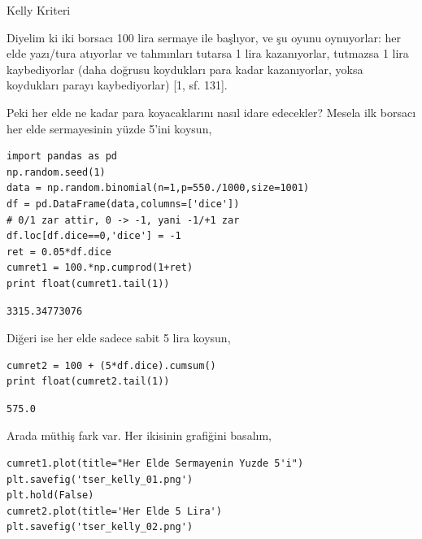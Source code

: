 \documentclass[12pt,fleqn]{article}\usepackage{../../common}
\begin{document}
Kelly Kriteri 

Diyelim ki iki borsacı 100 lira sermaye ile başlıyor, ve şu oyunu
oynuyorlar: her elde yazı/tura atıyorlar ve tahmınları tutarsa 1 lira
kazanıyorlar, tutmazsa 1 lira kaybediyorlar (daha doğrusu koydukları para
kadar kazanıyorlar, yoksa koydukları parayı kaybediyorlar) [1, sf. 131].

Peki her elde ne kadar para koyacaklarını nasıl idare edecekler? Mesela ilk
borsacı her elde sermayesinin yüzde 5'ini koysun,

\begin{verbatim}
import pandas as pd
np.random.seed(1)
data = np.random.binomial(n=1,p=550./1000,size=1001)
df = pd.DataFrame(data,columns=['dice'])
# 0/1 zar attir, 0 -> -1, yani -1/+1 zar
df.loc[df.dice==0,'dice'] = -1
ret = 0.05*df.dice
cumret1 = 100.*np.cumprod(1+ret)
print float(cumret1.tail(1))
\end{verbatim}

\begin{verbatim}
3315.34773076
\end{verbatim}

Diğeri ise her elde sadece sabit 5 lira koysun,

\begin{verbatim}
cumret2 = 100 + (5*df.dice).cumsum()
print float(cumret2.tail(1))
\end{verbatim}

\begin{verbatim}
575.0
\end{verbatim}

Arada müthiş fark var. Her ikisinin grafiğini basalım, 

\begin{verbatim}
cumret1.plot(title="Her Elde Sermayenin Yuzde 5'i")
plt.savefig('tser_kelly_01.png')
plt.hold(False)
cumret2.plot(title='Her Elde 5 Lira')
plt.savefig('tser_kelly_02.png')
\end{verbatim}
\end{document}
